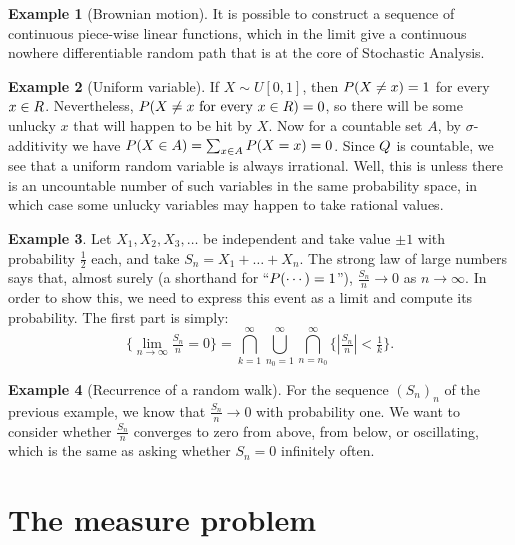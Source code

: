 \documentclass[
]{book}
\let\mathbb\relax %
\newcommand{\Pb}{\mathbb{P}}
\newcommand{\Q}{\mathbb{Q}}
\newcommand{\R}{\mathbb{R}}
\renewcommand*{\geq}{\geqslant}
\theoremstyle{definition}
\theoremstyle{definition}
\newtheorem{example}{Example}[chapter]
\theoremstyle{definition}
\theoremstyle{definition}
\theoremstyle{remark}
\begin{document}
\begin{example}[Brownian motion]
It is possible to construct a sequence of continuous piece-wise linear
functions, which in the limit give a continuous nowhere differentiable
random path that is at the core of Stochastic Analysis.
\end{example}

\begin{example}[Uniform variable]
If \(X \sim U[0,1]\), then \(\Pb(X \ne x) = 1\) for every \(x \in \R\).
Nevertheless, \(\Pb(X \ne x \text{ for every } x \in \R ) = 0\), so there
will be some unlucky \(x\) that will happen to be hit by \(X\). Now for a
countable set \(A\), by \(\sigma\)-additivity we have
\(\Pb(X \in A) = \sum_{x \in A} \Pb(X=x) = 0\). Since \(\Q\) is countable,
we see that a uniform random variable is always irrational. Well, this
is unless there is an uncountable number of such variables in the same
probability space, in which case some unlucky variables may happen to
take rational values.
\end{example}

\begin{example}
Let \(X_1,X_2,X_3,\dots\) be independent and take value \(\pm 1\) with
probability \(\frac{1}{2}\) each, and take \(S_n = X_1 + \dots + X_n\). The
strong law of large numbers says that, almost surely (a shorthand for
``\(\Pb(\cdots)=1\)''), \(\frac{S_n}{n} \to 0\) as \(n \to \infty\). In order to
show this, we need to express this event as a limit and compute its
probability. The first part is simply:
\[\{\lim_{n \to \infty} \tfrac{S_n}{n} = 0\}
=
\bigcap_{k=1}^\infty
\bigcup_{n_0=1}^\infty
\bigcap_{n=n_0}^\infty
\{|\tfrac{S_n}{n}| < \tfrac{1}{k} \}
.\]
\end{example}

\begin{example}[Recurrence of a random walk]
For the sequence \((S_n)_n\) of the previous example, we know that
\(\frac{S_n}{n} \to 0\) with probability one. We want to consider whether
\(\frac{S_n}{n}\) converges to zero from above, from below, or
oscillating, which is the same as asking whether \(S_n=0\) infinitely
often.
\end{example}

\hypertarget{sub:measureproblem}{%
\section{The measure problem}\label{sub:measureproblem}}
\end{document}

